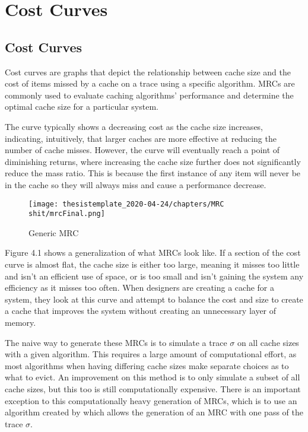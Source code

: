 \chapter{Cost Curves}
\section{Cost Curves}
Cost curves are graphs that depict the relationship between cache size and the cost of items missed by a cache on a trace using a specific algorithm. MRCs are commonly used to evaluate caching algorithms' performance and determine the optimal cache size for a particular system.

The curve typically shows a decreasing cost as the cache size increases, indicating, intuitively, that larger caches are more effective at reducing the number of cache misses. However, the curve will eventually reach a point of diminishing returns, where increasing the cache size further does not significantly reduce the mass ratio. This is because the first instance of any item will never be in the cache so they will always miss and cause a performance decrease.

\begin{figure}[H]
    \centering
    \texttt{[image: thesistemplate\_2020-04-24/chapters/MRC shit/mrcFinal.png]}
    \caption{Generic MRC}
    \label{fig:my_label}
\end{figure}

Figure 4.1 shows a generalization of what MRCs look like. If a section of the cost curve is almost flat, the cache size is either too large, meaning it misses too little and isn't an efficient use of space, or is too small and isn't gaining the system any efficiency as it misses too often. When designers are creating a cache for a system, they look at this curve and attempt to balance the cost and size to create a cache that improves the system without creating an unnecessary layer of memory.


The naive way to generate these MRCs is to simulate a trace $\sigma$ on all cache sizes with a given algorithm. This requires a large amount of computational effort, as most algorithms when having differing cache sizes make separate choices as to what to evict. An improvement on this method is to only simulate a subset of all cache sizes, but this too is still computationally expensive. There is an important exception to this computationally heavy generation of MRCs, which is to use an algorithm created by \cite{mattson1970evaluation} which allows the generation of an MRC with one pass of the trace $\sigma$.

